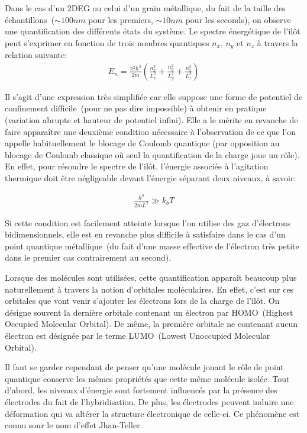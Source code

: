 Dans le cas d'un 2DEG ou celui d'un grain métallique, du fait de la taille des échantillons~($\sim 100nm$ pour les premiers, $\sim 10nm$ pour les seconds), on observe une quantification des différents états du système. Le spectre énergétique de l'il\^ot peut s'exprimer en fonction de trois nombres quantiques $n_x$, $n_y$ et $n_z$ à travers la relation suivante:
\begin{eqnarray}
E_n = \frac{\pi^2 \hbar^2}{2m}(\frac{n_x^2}{L_x^2} + \frac{n_y^2}{L_y^2} + \frac{n_z^2}{L_z^2}) \nonumber
\end{eqnarray}


Il s'agit d'une expression très simplifiée car elle suppose une forme de potentiel de confinement difficile~(pour ne pas dire impossible) à obtenir en pratique (variation abrupte et hauteur de potentiel infini). Elle a le mérite en revanche de faire appara\^itre une deuxième condition nécessaire à l'observation de ce que l'on appelle habituellement le blocage de Coulomb quantique (par opposition au blocage de Coulomb classique où seul la quantification de la charge joue un rôle). En effet, pour résoudre le spectre de l'il\^ot, l'énergie associée à l'agitation thermique doit \^etre négligeable devant l'énergie séparant deux niveaux, à savoir:

\begin{eqnarray}
\frac{\hbar^2}{2mL^2} \gg k_bT \nonumber
\end{eqnarray}

Si cette condition est facilement atteinte lorsque l'on utilise des gaz d'électrons bidimensionnels, elle est en revanche plus difficile à satisfaire dans le cas d'un point quantique métallique~(du fait d'une masse effective de l'électron très petite dans le premier cas contrairement au second). \newline


Lorsque des molécules sont utilisées, cette quantification apparaît beaucoup plus naturellement à travers la notion d'orbitales moléculaires. En effet, c'est sur ces orbitales que vont venir s'ajouter les électrons lors de la charge de l'il\^ot. On désigne souvent la dernière orbitale contenant un électron par HOMO~(Highest Occupied Molecular Orbital). De même, la première orbitale ne contenant aucun électron est désignée par le terme LUMO~(Lowest Unoccupied Molecular Orbital).

Il faut se garder cependant de penser qu'une molécule jouant le r\^ole de point quantique conserve les mêmes propriétés que cette m\^eme molécule isolée. Tout d'abord, les niveaux d'énergie sont fortement influencés par la présence des électrodes du fait de l'hybridisation. De plus, les électrodes peuvent induire une déformation qui va altérer la structure électronique de celle-ci. Ce phénomène est connu sour le nom d'effet Jhan-Teller. 

